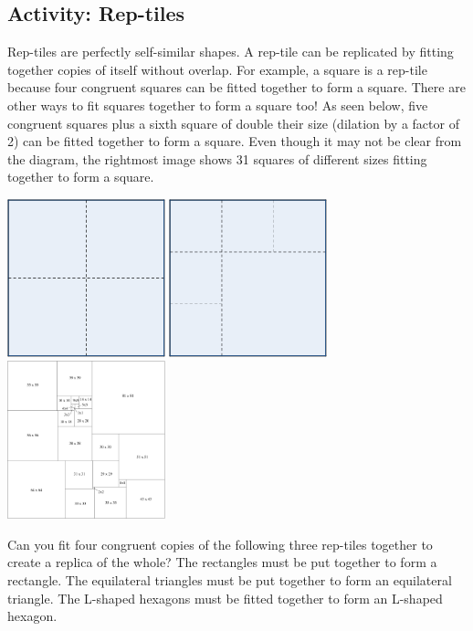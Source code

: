 \subsection{Activity: Rep-tiles}
Rep-tiles are perfectly self-similar shapes. A rep-tile can be replicated by fitting together copies of itself without overlap. For example, a square is a rep-tile because four congruent squares can be fitted together to form a square. There are other ways to fit squares together to form a square too! As seen below, five congruent squares plus a sixth square of double their size (dilation by a factor of 2) can be fitted together to form a square. Even though it may not be clear from the diagram, the rightmost image shows 31 squares of different sizes fitting together to form a square.
\begin{center}
    \includegraphics[height=1.8in]{images/rep-tile01} \hfill \includegraphics[height=1.8in]{images/rep-tile02} \hfill \includegraphics[height=1.8in]{images/gardner-01}
\end{center}
Can you fit four congruent copies of the following three rep-tiles together to create a replica of the whole? The rectangles must be put together to form a rectangle. The equilateral triangles must be put together to form an equilateral triangle. The L-shaped hexagons must be fitted together to form an L-shaped hexagon.
